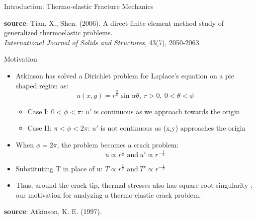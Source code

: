 \documentclass{beamer}
\begin{document}
\begin{frame}[t,fragile]{Introduction: Thermo-elastic Fracture Mechanics}
\begin{itemize}
\begin{figure}[H]
\begin{subfigure}{0.45\textwidth}
 \end{subfigure}
 \end{figure}
 \end{itemize}
 \vspace{.1cm}
   \tiny
   \hspace{15pt}
     \textbf{source}: Tian, X., Shen. (2006). A direct finite element method study of generalized thermoelastic problems. \\
   \vspace{-7pt}
   \hspace{15pt}
   \emph{International Journal of Solids and Structures}, 43(7), 2050-2063.
\end{frame}
\begin{frame}[t,fragile]{Motivation}
    \vspace{-.3cm}
    \footnotesize
\begin{itemize}
     \item Atkinson has solved a Dirichlet problem for Laplace's equation on a pie shaped region as:\vspace{-.2cm}
         $$u(x,y)= r^{\frac{\pi}{\phi}}\sin\alpha\theta,\  r>0,\ 0<\theta<\phi$$
        \vspace{-.6cm}
        \begin{itemize}
                \footnotesize
     \item Case I: $0<\phi<\pi$:
        $u'$ is continuous as we approach towards the origin 
     \item Case II: $\pi<\phi<2\pi$:
        $u'$ is not continuous as (x,y) approaches the origin 
    \end{itemize}
     \item When $\phi=2\pi$, the problem becomes a crack problem:
    \vspace{-.1cm}$$u \propto r^{\frac{1}{2}}\text{ and} \ u'\propto  r^{-\frac{1}{2}}$$ 
    \vspace{-.4cm}
     \item Substituting T in place of u: 
       $T \propto r^{\frac{1}{2}}\text{ and} \ T'\propto  r^{-\frac{1}{2}}$ 
    \item Thus, around the crack tip, thermal stresses also has square root singularity : our motivation for analyzing a thermo-elastic crack problem. 
\end{itemize}
  \tiny
  \vspace{10pt}
  \hspace{10pt}
    \textbf{source}: Atkinson, K. E. (1997).

\end{frame}
\end{document}
